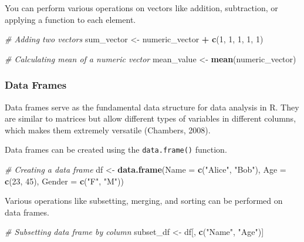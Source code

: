 \documentclass[
]{book}
\newenvironment{Shaded}{\begin{snugshade}}{\end{snugshade}}
\newcommand{\AttributeTok}[1]{\textcolor[rgb]{0.13,0.29,0.53}{#1}}
\newcommand{\CommentTok}[1]{\textcolor[rgb]{0.56,0.35,0.01}{\textit{#1}}}
\newcommand{\DecValTok}[1]{\textcolor[rgb]{0.00,0.00,0.81}{#1}}
\newcommand{\FunctionTok}[1]{\textcolor[rgb]{0.13,0.29,0.53}{\textbf{#1}}}
\newcommand{\NormalTok}[1]{#1}
\newcommand{\OtherTok}[1]{\textcolor[rgb]{0.56,0.35,0.01}{#1}}
\newcommand{\SpecialCharTok}[1]{\textcolor[rgb]{0.81,0.36,0.00}{\textbf{#1}}}
\newcommand{\StringTok}[1]{\textcolor[rgb]{0.31,0.60,0.02}{#1}}
\begin{document}
You can perform various operations on vectors like addition, subtraction, or applying a function to each element.

\begin{Shaded}
\begin{Highlighting}[]
\CommentTok{\# Adding two vectors}
\NormalTok{sum\_vector }\OtherTok{\textless{}{-}}\NormalTok{ numeric\_vector }\SpecialCharTok{+} \FunctionTok{c}\NormalTok{(}\DecValTok{1}\NormalTok{, }\DecValTok{1}\NormalTok{, }\DecValTok{1}\NormalTok{, }\DecValTok{1}\NormalTok{, }\DecValTok{1}\NormalTok{)}

\CommentTok{\# Calculating mean of a numeric vector}
\NormalTok{mean\_value }\OtherTok{\textless{}{-}} \FunctionTok{mean}\NormalTok{(numeric\_vector)}
\end{Highlighting}
\end{Shaded}

\subsubsection*{Data Frames}\label{data-frames}

Data frames serve as the fundamental data structure for data analysis in R. They are similar to matrices but allow different types of variables in different columns, which makes them extremely versatile (Chambers, 2008).

Data frames can be created using the \texttt{data.frame()} function.

\begin{Shaded}
\begin{Highlighting}[]
\CommentTok{\# Creating a data frame}
\NormalTok{df }\OtherTok{\textless{}{-}} \FunctionTok{data.frame}\NormalTok{(}\AttributeTok{Name =} \FunctionTok{c}\NormalTok{(}\StringTok{"Alice"}\NormalTok{, }\StringTok{"Bob"}\NormalTok{), }\AttributeTok{Age =} \FunctionTok{c}\NormalTok{(}\DecValTok{23}\NormalTok{, }\DecValTok{45}\NormalTok{), }\AttributeTok{Gender =} \FunctionTok{c}\NormalTok{(}\StringTok{"F"}\NormalTok{, }\StringTok{"M"}\NormalTok{))}
\end{Highlighting}
\end{Shaded}

Various operations like subsetting, merging, and sorting can be performed on data frames.

\begin{Shaded}
\begin{Highlighting}[]
\CommentTok{\# Subsetting data frame by column}
\NormalTok{subset\_df }\OtherTok{\textless{}{-}}\NormalTok{ df[, }\FunctionTok{c}\NormalTok{(}\StringTok{"Name"}\NormalTok{, }\StringTok{"Age"}\NormalTok{)]}
\end{Highlighting}
\end{Shaded}
\end{document}
